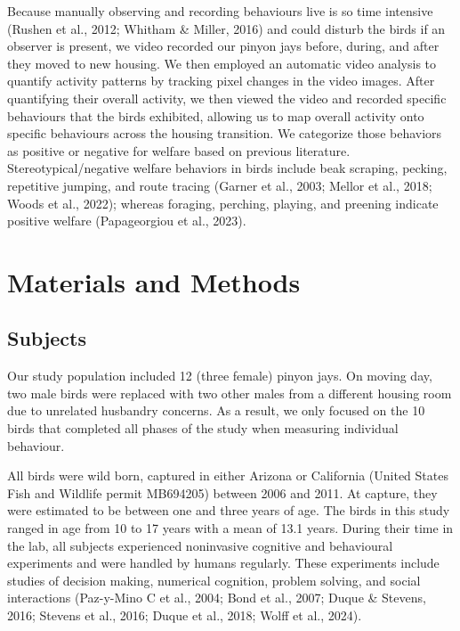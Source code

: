 \documentclass[
  pub]{apa6}
\begin{document}
Because manually observing and recording behaviours live is so time intensive (Rushen et al., 2012; Whitham \& Miller, 2016) and could disturb the birds if an observer is present, we video recorded our pinyon jays before, during, and after they moved to new housing. We then employed an automatic video analysis to quantify activity patterns by tracking pixel changes in the video images. After quantifying their overall activity, we then viewed the video and recorded specific behaviours that the birds exhibited, allowing us to map overall activity onto specific behaviours across the housing transition. We categorize those behaviors as positive or negative for welfare based on previous literature. Stereotypical/negative welfare behaviors in birds include beak scraping, pecking, repetitive jumping, and route tracing (Garner et al., 2003; Mellor et al., 2018; Woods et al., 2022); whereas foraging, perching, playing, and preening indicate positive welfare (Papageorgiou et al., 2023).

\section{Materials and Methods}\label{materials-and-methods}

\subsection{Subjects}\label{subjects}

Our study population included 12 (three female) pinyon jays. On moving day, two male birds were replaced with two other males from a different housing room due to unrelated husbandry concerns. As a result, we only focused on the 10 birds that completed all phases of the study when measuring individual behaviour.

All birds were wild born, captured in either Arizona or California (United States Fish and Wildlife permit MB694205) between 2006 and 2011. At capture, they were estimated to be between one and three years of age. The birds in this study ranged in age from 10 to 17 years with a mean of 13.1 years. During their time in the lab, all subjects experienced noninvasive cognitive and behavioural experiments and were handled by humans regularly. These experiments include studies of decision making, numerical cognition, problem solving, and social interactions (Paz-y-Mino C et al., 2004; Bond et al., 2007; Duque \& Stevens, 2016; Stevens et al., 2016; Duque et al., 2018; Wolff et al., 2024).
\end{document}
